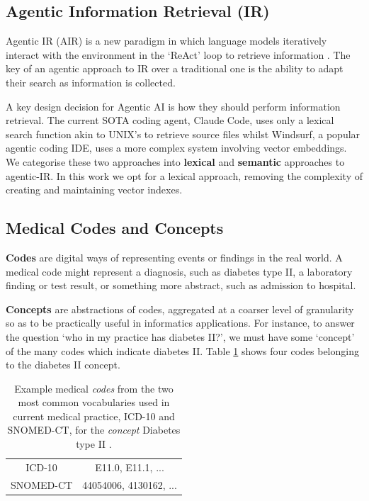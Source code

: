 \documentclass[11pt]{article}
\begin{document}
\subsection{Agentic Information Retrieval (IR)}
Agentic IR (AIR) is a new paradigm in which language models iteratively interact with the environment in the `ReAct' loop to retrieve information \citet{zhang_agentic_2025}.
The key of an agentic approach to IR over a traditional one is the ability to adapt their search as information is collected.

A key design decision for Agentic AI is how they should perform information retrieval.
The current SOTA coding agent, Claude Code, uses only a lexical search function akin to UNIX's  to retrieve source files whilst Windsurf, a popular agentic coding IDE, uses a more complex system involving vector embeddings.
We categorise these two approaches into \textbf{lexical} and \textbf{semantic} approaches to agentic-IR.
In this work we opt for a lexical approach, removing the complexity of creating and maintaining vector indexes.


\subsection{Medical Codes and Concepts}

\textbf{Codes} are digital ways of representing events or findings in the real world. A medical code might represent a diagnosis, such as diabetes type II, a laboratory finding or test result, or something more abstract, such as admission to hospital.

\textbf{Concepts} are abstractions of codes, aggregated at a coarser level of granularity so as to be practically useful in informatics applications.
For instance, to answer the question `who in my practice has diabetes II?', we must have some `concept' of the many codes which indicate diabetes II. Table \ref{tab:concept-as-multi-vocab-codelist} shows four codes belonging to the diabetes II concept.


\begin{table}[h]
    \centering
    \begin{tabular}{|c|c|}
         \hline
         ICD-10 & E11.0, E11.1, ... \\
         SNOMED-CT & 44054006, 4130162, ...\\
         \hline
    \end{tabular}
    \caption{Example medical \textit{codes} from the two most common vocabularies used in current medical practice, ICD-10 and SNOMED-CT, for the \textit{concept} Diabetes type II \cite{world_health_organization_icd-10_2004, bhattacharyya_introduction_2015}.}
    \label{tab:concept-as-multi-vocab-codelist}
\end{table}
\end{document}

